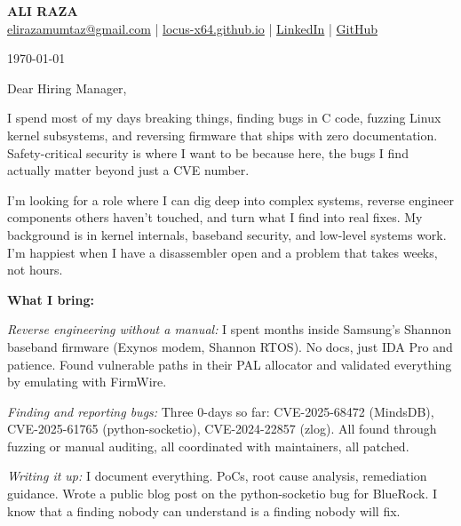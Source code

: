 \documentclass[a4paper,11pt]{article}
\newcommand{\headerfontiii}{\fontfamily{ppl}\selectfont}
\begin{document}
\headerfontiii

\begin{center}
    {\Large\textbf{ALI RAZA}}\\[1mm]
    \small{
    \href{mailto:elirazamumtaz@gmail.com}{elirazamumtaz@gmail.com} | 
    \href{https://locus-x64.github.io/}{locus-x64.github.io} |
    \href{https://www.linkedin.com/in/locus-x64/}{LinkedIn} |
    \href{https://github.com/locus-x64}{GitHub}
    }
\end{center}

\vspace{5mm}

\noindent
\today

\vspace{5mm}

\noindent
Dear Hiring Manager,

\vspace{3mm}

I spend most of my days breaking things, finding bugs in C code, fuzzing Linux kernel subsystems, and reversing firmware that ships with zero documentation. Safety-critical security is where I want to be because here, the bugs I find actually matter beyond just a CVE number.

\vspace{3mm}

I'm looking for a role where I can dig deep into complex systems, reverse engineer components others haven't touched, and turn what I find into real fixes. My background is in kernel internals, baseband security, and low-level systems work. I'm happiest when I have a disassembler open and a problem that takes weeks, not hours.

\vspace{3mm}

\textbf{What I bring:}

\vspace{1mm}
\textit{Reverse engineering without a manual:} I spent months inside Samsung's Shannon baseband firmware (Exynos modem, Shannon RTOS). No docs, just IDA Pro and patience. Found vulnerable paths in their PAL allocator and validated everything by emulating with FirmWire.

\vspace{1mm}
\textit{Finding and reporting bugs:} Three 0-days so far: CVE-2025-68472 (MindsDB), CVE-2025-61765 (python-socketio), CVE-2024-22857 (zlog). All found through fuzzing or manual auditing, all coordinated with maintainers, all patched.

\vspace{1mm}
\textit{Writing it up:} I document everything. PoCs, root cause analysis, remediation guidance. Wrote a public blog post on the python-socketio bug for BlueRock. I know that a finding nobody can understand is a finding nobody will fix.
\end{document}

